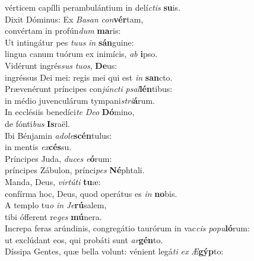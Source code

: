 \oddverse vérticem capílli perambulántium in delí\textit{ctis} \textbf{su}is.\\
\evenverse Dixit Dóminus: Ex \textit{Ba}\textit{san} \textit{con}\textbf{vér}tam,~\*\\
\evenverse convértam in profún\textit{dum} \textbf{ma}ris:\\
\oddverse Ut intingátur pes \textit{tu}\textit{us} \textit{in} \textbf{sán}guine:~\*\\
\oddverse lingua canum tuórum ex inimícis, \textit{ab} \textbf{i}pso.\\
\evenverse Vidérunt ingrés\textit{sus} \textit{tu}\textit{os}, \textbf{De}us:~\*\\
\evenverse ingréssus Dei mei: regis mei qui est \textit{in} \textbf{san}cto.\\
\oddverse Prævenérunt príncipes con\textit{jún}\textit{cti} \textit{psal}\textbf{lén}tibus:~\*\\
\oddverse in médio juvenculárum tympani\textit{stri}\textbf{á}rum.\\
\evenverse In ecclésiis benedíci\textit{te} \textit{De}\textit{o} \textbf{Dó}mino,~\*\\
\evenverse de fónti\textit{bus} \textbf{Is}raël.\\
\oddverse Ibi Bénjamin \textit{a}\textit{do}\textit{le}\textbf{scén}tulus:~\*\\
\oddverse in mentis \textit{ex}\textbf{cés}su.\\
\evenverse Príncipes Juda, \textit{du}\textit{ces} \textit{e}\textbf{ó}rum:~\*\\
\evenverse príncipes Zábulon, prínci\textit{pes} \textbf{Né}phtali.\\
\oddverse Manda, Deus, \textit{vir}\textit{tú}\textit{ti} \textbf{tu}æ:~\*\\
\oddverse confírma hoc, Deus, quod operátus es \textit{in} \textbf{no}bis.\\
\evenverse A templo tu\textit{o} \textit{in} \textit{Je}\textbf{rú}salem,~\*\\
\evenverse tibi ófferent re\textit{ges} \textbf{mú}nera.\\
\oddverse Increpa feras arúndinis, congregátio taurórum in vac\textit{cis} \textit{po}\textit{pu}\textbf{ló}rum:~\*\\
\oddverse ut exclúdant eos, qui probáti sunt \textit{ar}\textbf{gén}to.\\
\evenverse Díssipa Gentes, quæ bella volunt: vénient legá\textit{ti} \textit{ex} \textit{Æ}\textbf{gýp}to:~\*\\
